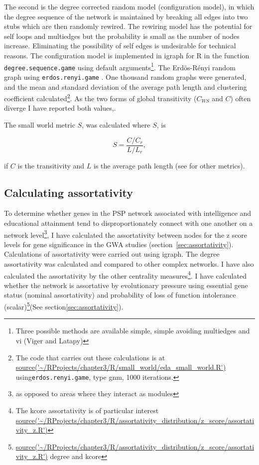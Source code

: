 The second is the degree corrected random model (configuration model), in which the degree sequence of the network is maintained by breaking all edges into two stubs which are then randomly rewired. The rewiring model has the potential for self loops and multiedges but the probability is small as the number of nodes increase. Eliminating the possibility of self edges is undesirable for technical reasons\cite{newman2018networks}. The configuration model is implemented in igraph for R in the function \texttt{degree.sequence.game} using default arguments\footnote{Three possible methods are available simple, simple avoiding multiedges and vi (Viger and Latapy)}. The Erd{\"o}s-R{\'e}nyi random graph using \texttt{erdos.renyi.game} . One thousand random graphs were generated, and the mean and standard deviation of the average path length and clustering coefficient calculated\footnote{The code that carries out these calculations is at \url{source('~/RProjects/chapter3/R/small_world/eda_small_world.R')}
using\texttt{erdos.renyi.game}, type gnm, 1000 iterations.}. As the two forms of global transitivity ($C_{WS}$ and $C$) often diverge I have reported both values\cite{estrada2016local},\cite{humphries2008network}. 

The small world metric $S$, was calculated where $S$, is

\begin{equation}
    S = \frac{C/C_r}{L/L_r},
    \label{eq:small worldness}
\end{equation}

if $C$ is the transitivity and $L$ is the average path length (see \cite{neal2017small} for other metrics). 
 
\subsection{Calculating assortativity}
\label{sec:Assortativity methods}
To determine whether genes in the PSP network associated with intelligence and educational attainment tend to disproportionately connect with one another on a network level\footnote{as opposed to areas where they interact as modules}, I have calculated the assortativity between nodes for the z score levels for gene significance in the GWA studies (section~\ref{sec:assortativity}). Calculations of assortativity were carried out using igraph. The degree assortativity was calculated and compared to other complex networks. I have also calculated the assortativity by the other centrality measures\footnote{ The kcore assortativity is of particular interest \url{source('~/RProjects/chapter3/R/assortativity_distribution/z_score/assortativity_z.R')}}. I have calculated whether the network is assortative by evolutionary pressure using essential gene status (nominal assortativity) and probability of loss of function intolerance (scalar)\footnote{  \url{source('~/RProjects/chapter3/R/assortativity_distribution/z_score/assortativity_z.R')} degree and kcore }(See section\ref{sec:assortativity}).

